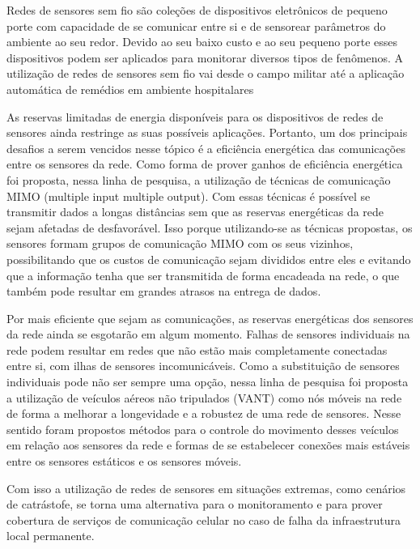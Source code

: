 \documentclass[12pt]{article}
\begin{document}
Redes de sensores sem fio são coleções de dispositivos eletrônicos de pequeno porte com capacidade de se comunicar entre si e de sensorear parâmetros do ambiente ao seu redor. Devido ao seu baixo custo e ao seu pequeno porte esses dispositivos podem ser aplicados para monitorar diversos tipos de fenômenos. A utilização de redes de sensores sem fio vai desde o campo militar até a aplicação automática de remédios em ambiente hospitalares \cite{Akyildiz2002} 

As reservas limitadas de energia disponíveis para os dispositivos de redes de sensores ainda restringe as suas possíveis aplicações. Portanto, um dos principais desafios a serem vencidos nesse tópico é a eficiência energética das comunicações entre os sensores da rede. Como forma de prover ganhos de eficiência energética foi proposta, nessa linha de pesquisa, a utilização de técnicas de comunicação MIMO (multiple input multiple output). Com essas técnicas é possível se transmitir dados a longas distâncias sem que as reservas energéticas da rede sejam afetadas de desfavorável. Isso porque utilizando-se as técnicas propostas, os sensores formam grupos de comunicação MIMO com os seus vizinhos, possibilitando que os custos de comunicação sejam divididos entre eles e evitando que a informação tenha que ser transmitida de forma encadeada na rede, o que também pode resultar em grandes atrasos na entrega de dados. 

Por mais eficiente que sejam as comunicações, as reservas energéticas dos sensores da rede ainda se esgotarão em algum momento. Falhas de sensores individuais na rede podem resultar em redes que não estão mais completamente conectadas entre si, com ilhas de sensores incomunicáveis. Como a substituição de sensores individuais pode não ser sempre uma opção, nessa linha de pesquisa foi proposta a utilização de veículos aéreos não tripulados (VANT) como nós móveis na rede de forma a melhorar a longevidade e a robustez de uma rede de sensores. Nesse sentido foram propostos métodos para o controle do movimento desses veículos em relação aos sensores da rede e formas de se estabelecer conexões mais estáveis entre os sensores estáticos e os sensores móveis.

Com isso a utilização de redes de sensores em situações extremas, como cenários de catrástofe, se torna uma alternativa para o monitoramento e para prover cobertura de serviços de comunicação celular no caso de falha da infraestrutura local permanente.
\end{document}
